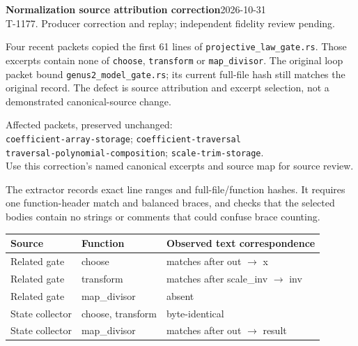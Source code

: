 \documentclass[10pt]{article}
\begin{document}
\textbf{Normalization source attribution correction}\hfill2026-10-31\\T-1177. Producer correction and replay; independent fidelity review pending.

Four recent packets copied the first 61 lines of \texttt{projective\_law\_gate.rs}. Those excerpts contain none of \texttt{choose}, \texttt{transform} or \texttt{map\_divisor}. The original loop packet bound \texttt{genus2\_model\_gate.rs}; its current full-file hash still matches the original record. The defect is source attribution and excerpt selection, not a demonstrated canonical-source change.

Affected packets, preserved unchanged:\\
\texttt{coefficient-array-storage}; \texttt{coefficient-traversal}\\
\texttt{traversal-polynomial-composition}; \texttt{scale-trim-storage}.\\
Use this correction's named canonical excerpts and source map for source review.

\begin{center}\end{center}
The extractor records exact line ranges and full-file/function hashes. It requires one function-header match and balanced braces, and checks that the selected bodies contain no strings or comments that could confuse brace counting.

\begin{tabular}{lll}
Source & Function & Observed text correspondence\\\hline
Related gate & choose & matches after out $\to$ x\\
Related gate & transform & matches after scale\_inv $\to$ inv\\
Related gate & map\_divisor & absent\\
State collector & choose, transform & byte-identical\\
State collector & map\_divisor & matches after out $\to$ result
\end{tabular}
\end{document}
